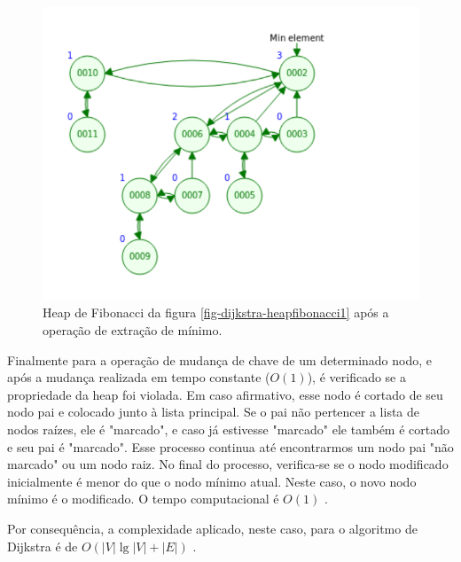 
\begin{figure}[H]
\centering
\includegraphics[width=.54\textwidth]{figuras/fibonacci-heap2} 
\caption{Heap de Fibonacci da figura \ref{fig-dijkstra-heapfibonacci1} após a operação de extração de mínimo.}
\label{fig-dijkstra-heapfibonacci2}
\end{figure}


Finalmente para a operação de mudança de chave de um determinado nodo, e após a mudança realizada em tempo constante ($O(1)$), é verificado se a propriedade da heap foi violada. Em caso afirmativo, esse nodo é cortado de seu nodo pai e colocado junto à lista principal. Se o pai não pertencer a lista de nodos raízes, ele é "marcado", e caso já estivesse "marcado" ele também é cortado e seu pai é "marcado". Esse processo continua até encontrarmos um nodo pai "não marcado" ou um nodo raiz. No final do processo, verifica-se se o nodo modificado inicialmente é menor do que o nodo mínimo atual. Neste caso, o novo nodo mínimo é o modificado. O tempo computacional é $O(1)$ \cite{cormen2009introduction}.

Por consequência, a complexidade aplicado, neste caso, para o algoritmo de Dijkstra é de $O(|V|\lg |V| + |E|)$ \cite{cormen2009introduction}.